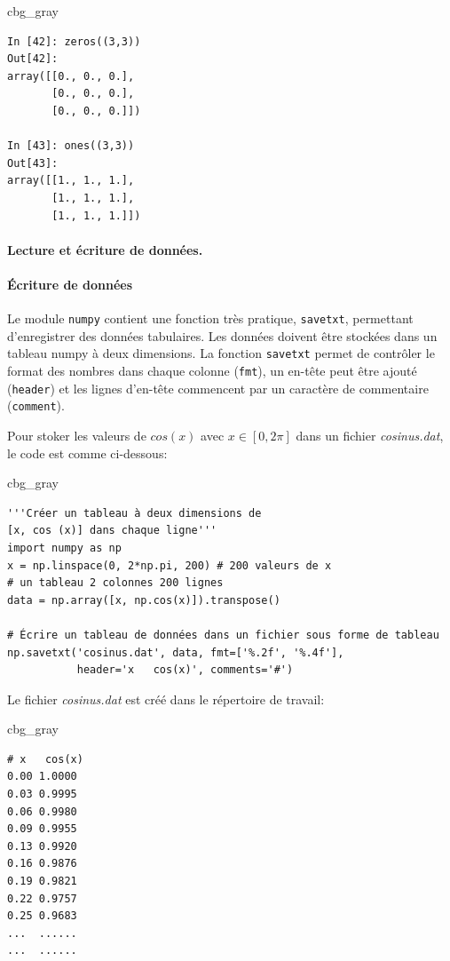 \documentclass[%
oneside,                 %
final,                   %
10pt,french]{article}
\newenvironment{_cod_tight}[1]{
   \def\FrameCommand{\colorbox{#1}}
   \FrameRule0.6pt\MakeFramed {\FrameRestore}\vskip3mm}
   {\vskip0mm\endMakeFramed}
\newenvironment{cod}[1]{
\bgroup\rmfamily
\fboxsep=0mm\relax
\begin{_cod_tight}{#1}
\list{}{\parsep=-2mm\parskip=0mm\topsep=0pt\leftmargin=2mm
\rightmargin=2\leftmargin\leftmargin=4pt\relax}
\item\relax}
{\endlist\end{_cod_tight}\egroup}
\newenvironment{blockshaded}
{\def\FrameCommand{\fboxsep=3mm\colorbox{grayicon_block_background}}
 \MakeFramed {\advance\hsize-\width \FrameRestore}}{\endMakeFramed}
\newenvironment{block_grayiconadmon}[1][Block]{
\begin{blockshaded}
\noindent
 \textbf{#1}\par
\nobreak\noindent\ignorespaces
}
{
\end{blockshaded}
}
\begin{document}
\begin{cod}{cbg_gray}\begin{verbatim}
In [42]: zeros((3,3))
Out[42]:
array([[0., 0., 0.],
       [0., 0., 0.],
       [0., 0., 0.]])

In [43]: ones((3,3))
Out[43]:
array([[1., 1., 1.],
       [1., 1., 1.],
       [1., 1., 1.]])
\end{verbatim}
\end{cod}
\noindent

\paragraph{Lecture et écriture de données.}
\paragraph{Écriture de données}

Le module \texttt{numpy} contient une fonction très pratique, \texttt{savetxt}, permettant d’enregistrer des données tabulaires. Les données doivent être stockées dans un tableau numpy à deux dimensions. La fonction \texttt{savetxt} permet de contrôler le format des nombres dans chaque colonne (\texttt{fmt}), un en-tête peut être ajouté (\texttt{header}) et les lignes d'en-tête commencent par un caractère de commentaire (\texttt{comment}).


\begin{block_grayiconadmon}[Exemple]

Pour stoker les valeurs de $cos(x)$ avec $x \in [0, 2 \pi]$ dans un fichier \emph{cosinus.dat}, le code est comme ci-dessous:

\begin{cod}{cbg_gray}\begin{verbatim}
'''Créer un tableau à deux dimensions de
[x, cos (x)] dans chaque ligne'''
import numpy as np
x = np.linspace(0, 2*np.pi, 200) # 200 valeurs de x
# un tableau 2 colonnes 200 lignes
data = np.array([x, np.cos(x)]).transpose()

# Écrire un tableau de données dans un fichier sous forme de tableau
np.savetxt('cosinus.dat', data, fmt=['%.2f', '%.4f'],
           header='x   cos(x)', comments='#')
\end{verbatim}
\end{cod}
\noindent
Le fichier \emph{cosinus.dat} est créé dans le répertoire de travail:
\begin{cod}{cbg_gray}\begin{verbatim}
# x   cos(x)
0.00 1.0000
0.03 0.9995
0.06 0.9980
0.09 0.9955
0.13 0.9920
0.16 0.9876
0.19 0.9821
0.22 0.9757
0.25 0.9683
...  ......
...  ......
\end{verbatim}
\end{cod}
\noindent
\end{block_grayiconadmon} %
\end{document}
